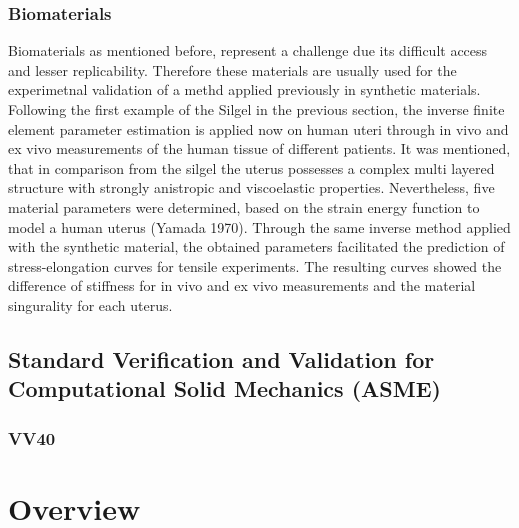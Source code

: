 \subsubsection*{Biomaterials}
Biomaterials as mentioned before, represent a challenge due its difficult access and lesser replicability.
Therefore these materials are usually used for the experimetnal validation of a methd applied previously in 
synthetic materials. 
 Following the first example of the Silgel in the previous section, the inverse finite element parameter
 estimation is applied now on human uteri \cite{Kauer2002} through in vivo and ex vivo measurements of the human tissue of 
 different patients. It was mentioned, that in comparison from the silgel the uterus possesses a complex 
 multi layered structure with strongly anistropic and viscoelastic properties. Nevertheless, five 
 material parameters were determined, based on the strain energy function to model a human uterus (Yamada 1970).
Through the same inverse method applied with the synthetic material, the obtained parameters facilitated the prediction of stress-elongation curves for tensile experiments. The 
 resulting curves showed the difference of stiffness for in vivo and ex vivo measurements and the material 
 singurality for each uterus.


\subsection{Standard Verification and Validation for Computational Solid Mechanics (ASME)}
\subsubsection*{VV40}



\section{Overview}